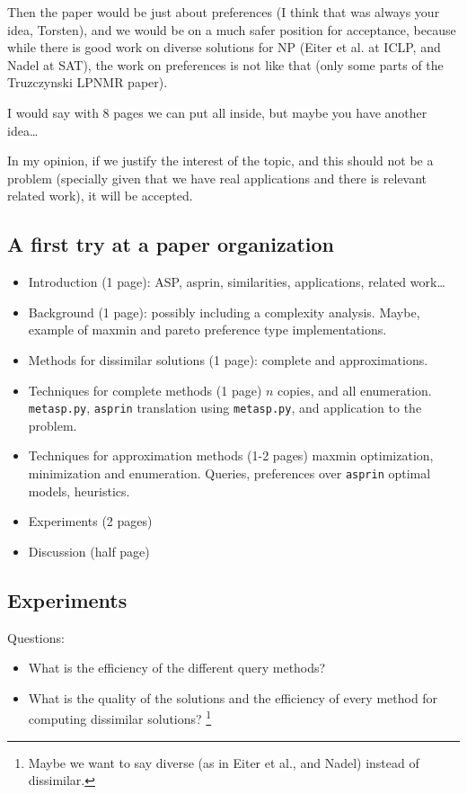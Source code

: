 \documentclass[a4paper,10pt]{article}
\begin{document}
Then the paper would be just about preferences 
(I think that was always your idea, Torsten), 
and we would be on a much safer position for acceptance, 
because while there is good work on diverse solutions for NP 
(Eiter et al. at ICLP, and Nadel at SAT), 
the work on preferences is not like that 
(only some parts of the Truzczynski LPNMR paper).

I would say with 8 pages we can put all inside, 
but maybe you have another idea\ldots

In my opinion, if we justify the interest of the topic, 
and this should not be a problem
(specially given that we have real applications and there is relevant related work), it will be accepted.



\subsection{A first try at a paper organization}

\begin{itemize}
\item
Introduction (1 page): ASP, asprin, similarities, applications, related work\ldots
\item
Background (1 page): possibly including a complexity analysis.
Maybe, example of maxmin and pareto preference type implementations.
\item
Methods for dissimilar solutions (1 page): complete and approximations.
\item
Techniques for complete methods (1 page)
$n$ copies, and all enumeration. \texttt{metasp.py}, \texttt{asprin} translation using \texttt{metasp.py}, and application to the problem.
\item
Techniques for approximation methods (1-2 pages)
maxmin optimization, minimization and enumeration. 
Queries, preferences over \texttt{asprin} optimal models, heuristics.
\item
Experiments (2 pages)
\item
Discussion (half page)
\end{itemize}


\subsection{Experiments}

Questions:
\begin{itemize}
\item
What is the efficiency of the different query methods?
\item
What is the quality of the solutions and the efficiency of 
every method for computing dissimilar solutions?
\footnote{Maybe we want to say diverse (as in Eiter et al., and Nadel) instead of dissimilar.}
\end{itemize}
\end{document}
